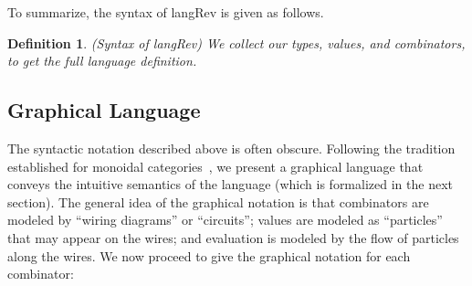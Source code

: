 \documentclass[preprint]{sigplanconf}
\newtheorem{definition}[theorem]{Definition}
\begin{document}
To summarize, the syntax of {{langRev}} is given as follows. 

\begin{definition}{(Syntax of {{langRev}})}
\label{def:langRev}
We collect our types, values, and combinators, to get the full language
definition.
%
\end{definition}

\subsection{Graphical Language}

The syntactic notation described above is often obscure. Following the
tradition established for monoidal
categories~\cite{springerlink:10.1007/978-3-642-12821-94}, we present a
graphical language that conveys the intuitive semantics of the language
(which is formalized in the next section). The general idea of the graphical
notation is that combinators are modeled by ``wiring diagrams'' or
``circuits''; values are modeled as ``particles'' that may appear on the
wires; and evaluation is modeled by the flow of particles along the wires. We
now proceed to give the graphical notation for each combinator:
\end{document}

